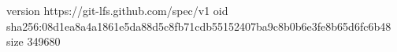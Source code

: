 version https://git-lfs.github.com/spec/v1
oid sha256:08d1ea8a4a1861e5da88d5c8fb71cdb55152407ba9c8b0b6e3fe8b65d6fc6b48
size 349680
